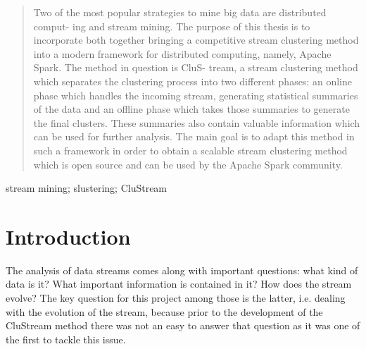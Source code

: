 \documentclass[10pt, conference, compsocconf]{IEEEtran}
\begin{document}
\maketitle


\begin{abstract}
Two of the most popular strategies to mine big data are distributed comput-
ing and stream mining. The purpose of this thesis is to incorporate both together
bringing a competitive stream clustering method into a modern framework for
distributed computing, namely, Apache Spark. The method in question is CluS-
tream, a stream clustering method which separates the clustering process into two
different phases: an online phase which handles the incoming stream, generating
statistical summaries of the data and an offline phase which takes those summaries
to generate the final clusters. These summaries also contain valuable information
which can be used for further analysis. The main goal is to adapt this method in
such a framework in order to obtain a scalable stream clustering method which is
open source and can be used by the Apache Spark community.
\end{abstract}

\begin{IEEEkeywords}
stream mining; slustering; CluStream
\end{IEEEkeywords}


%
\IEEEpeerreviewmaketitle



\section{Introduction}
The analysis of data streams comes along with important questions: what kind of
data is it? What important information is contained in it? How does the stream
evolve? The key question for this project among those is the latter, i.e. dealing with
the evolution of the stream, because prior to the development of the CluStream \cite{clustreamOrig}
method there was not an easy to answer that question as it was one of the first to
tackle this issue.
\end{document}
